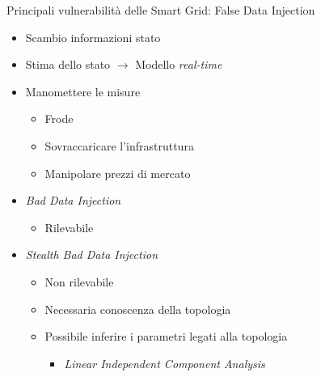 \begin{frame}{Principali vulnerabilità delle Smart Grid: False Data Injection}
	\begin{itemize}[<+- | alert@+>]
		\item Scambio informazioni stato
		\item Stima dello stato $\rightarrow$ Modello \textit{real-time}
		\item Manomettere le misure
		\begin{itemize}
			\item Frode
			\item Sovraccaricare l'infrastruttura
			\item Manipolare prezzi di mercato
		\end{itemize}
		\item \textit{Bad Data Injection}
		\begin{itemize}
			\item Rilevabile
		\end{itemize}
		\item \textit{Stealth Bad Data Injection}
		\begin{itemize}
			\item Non rilevabile
			\item Necessaria conoscenza della topologia
			\item Possibile inferire i parametri legati alla topologia
			\begin{itemize}
				\item \textit{Linear Independent Component Analysis}
			\end{itemize}
		\end{itemize}
	\end{itemize}
\end{frame}
